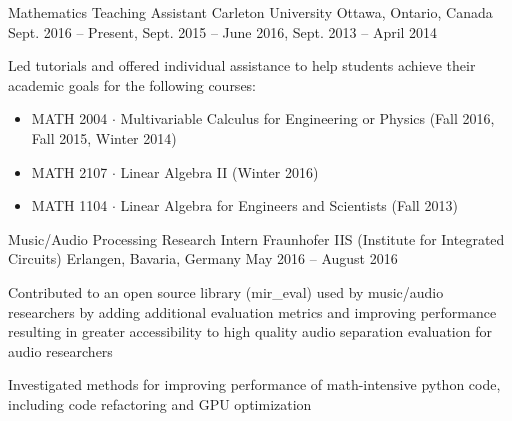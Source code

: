 

\begin{cventries}

    \cventry
      {Mathematics Teaching Assistant} %
      {Carleton University} %
      {Ottawa, Ontario, Canada} %
      {Sept. 2016 – Present, Sept. 2015 – June 2016, Sept. 2013 – April 2014} %
      {
        \begin{cvitems} %
          \item {Led tutorials and offered individual assistance to help students achieve their academic  goals for the following courses:}
            \begin{itemize}
              \item {MATH 2004 $\cdot$ Multivariable Calculus for Engineering or Physics (Fall 2016, Fall 2015, Winter 2014)}
              \item {MATH 2107 $\cdot$ Linear Algebra II (Winter 2016)}
              \item {MATH 1104 $\cdot$ Linear Algebra for Engineers and Scientists (Fall 2013)}
            \end{itemize}
        \end{cvitems}
      }

  \cventry
    {Music/Audio Processing Research Intern} %
    {Fraunhofer IIS (Institute for Integrated Circuits)} %
    {Erlangen, Bavaria, Germany} %
    {May 2016 – August 2016} %
    {
      \begin{cvitems} %
        \item {Contributed to an open source library (mir\_eval) used by music/audio researchers by adding additional evaluation metrics and improving performance resulting in greater accessibility to high quality audio separation evaluation for audio researchers}
        \item {Investigated methods for improving performance of math-intensive python code, including code refactoring and GPU optimization}
      \end{cvitems}
    }


\end{cventries}
